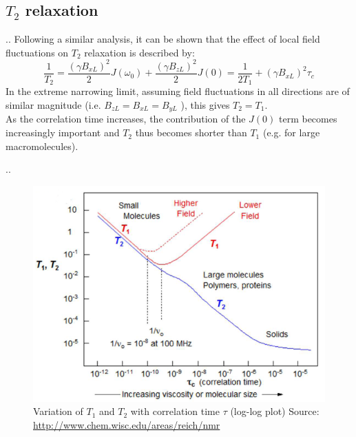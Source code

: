 \documentclass{beamer}
\begin{document}
\subsection{$T_2$ relaxation}
\begin{frame}{\thesection.\thesubsection. \insertsubsection}
	Following a similar analysis, it can be shown that the effect of local field fluctuations on $T_2$ relaxation is described by:
	\begin{equation} \label{eq: T2_relax}
	\dfrac{1}{T_2} = \dfrac{(\gamma B_{xL})^2}{2} J(\omega_0) + \dfrac{(\gamma B_{zL})^2}{2} J(0) = \dfrac{1}{2 T_1} + (\gamma B_{xL})^2 \tau_c
	\end{equation}
	In the extreme narrowing limit, assuming field fluctuations in all directions are of similar magnitude (i.e. $B_{zL} = B_{xL} = B_{yL}$ ), this gives $T_2 = T_1$. \\
	As the correlation time increases, the contribution of the $J(0)$ term becomes increasingly important and $T_2$ thus becomes shorter than $T_1$ (e.g. for large macromolecules).
\end{frame}

\begin{frame}{\thesection.\thesubsection. \insertsubsection}
   \begin{figure}
   	  \centering
   	  \includegraphics[scale=0.4]{figures/T1_T2_vs_tc.png}
   	  \caption{Variation of $T_1$ and $T_2$ with correlation time $\tau$ (log-log plot) Source: \url{http://www.chem.wisc.edu/areas/reich/nmr}
      }
   \end{figure}
\end{frame}
\end{document}
